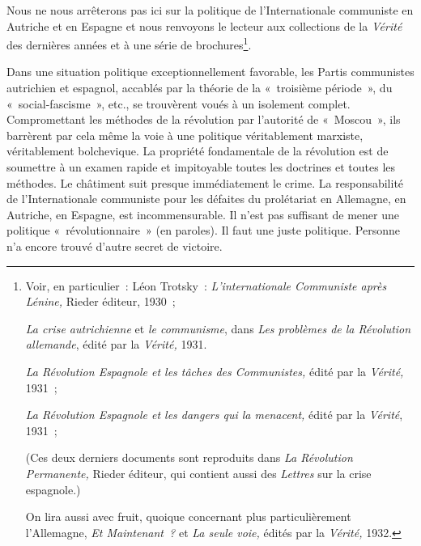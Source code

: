 \documentclass[french,twoside]{book} %
\begin{document}
\noindent Nous ne nous arrêterons pas ici sur la politique de l’Internationale communiste en Autriche et en Espagne et nous renvoyons le lecteur aux collections de la \emph{Vérité }des dernières années et à une série de brochures\footnote{ \noindent Voir, en particulier : Léon Trotsky : \emph{L’internationale Communiste après Lénine,} Rieder éditeur, 1930 ;\par
 \emph{La crise autrichienne} et \emph{le communisme}, dans \emph{Les problèmes de la Révolution allemande}, édité par la \emph{Vérité,} 1931.\par
 \emph{La Révolution Espagnole et les tâches des Communistes,} édité par la \emph{Vérité,} 1931 ;\par
 \emph{La Révolution Espagnole et les dangers qui la menacent,} édité par la \emph{Vérité}, 1931 ;\par
 (Ces deux derniers documents sont reproduits dans \emph{La Révolution Permanente,} Rieder éditeur, qui contient aussi des \emph{Lettres }sur la crise espagnole.)\par
 On lira aussi avec fruit, quoique concernant plus particulièrement l’Allemagne, \emph{Et Maintenant ?} et \emph{La seule voie,} édités par la \emph{Vérité,} 1932.
 }.\par
Dans une situation politique exceptionnellement favorable, les Partis communistes autrichien et espagnol, accablés par la théorie de la « troisième période », du « social-fascisme », etc., se trouvèrent voués à un isolement complet. Compromettant les méthodes de la révolution par  l’autorité de « Moscou », ils barrèrent par cela même la voie à une politique véritablement marxiste, véritablement bolchevique. La propriété fondamentale de la révolution est de soumettre à un examen rapide et impitoyable toutes les doctrines et toutes les méthodes. Le châtiment suit presque immédiatement le crime. La responsabilité de l’Internationale communiste pour les défaites du prolétariat en Allemagne, en Autriche, en Espagne, est incommensurable. Il n’est pas suffisant de mener une politique « révolutionnaire » (en paroles). Il faut une juste politique. Personne n’a encore trouvé d’autre secret de victoire.
\end{document}
